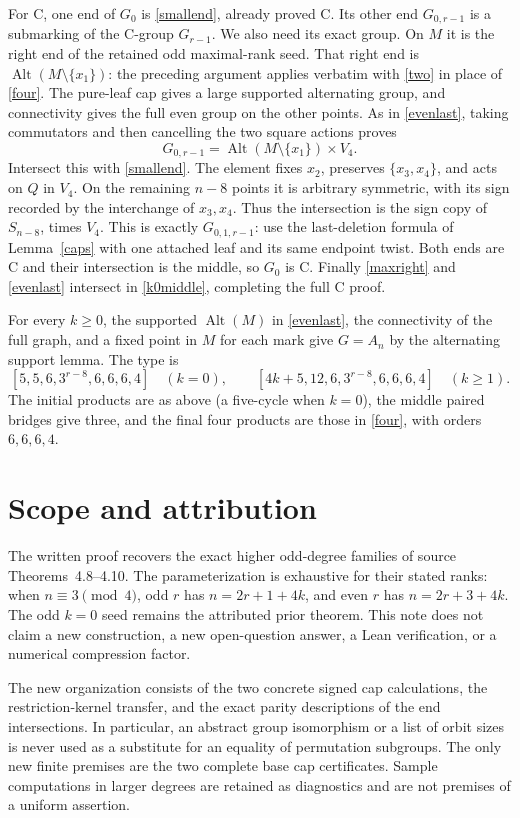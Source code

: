 \documentclass[11pt]{article}
\newcommand{\Alt}{\operatorname{Alt}}
\begin{document}
For C, one end of $G_0$ is \eqref{smallend}, already proved C.
Its other end $G_{0,r-1}$ is a submarking of the C-group
$G_{r-1}$. We also need its exact group. On $M$ it is the
right end of the retained odd maximal-rank seed. That right
end is $\Alt(M\setminus\{x_1\})$: the preceding argument
applies verbatim with \eqref{two} in place of \eqref{four}.
The pure-leaf cap gives a large supported alternating group,
and connectivity gives the full even group on the other points.
As in \eqref{evenlast}, taking commutators and then cancelling
the two square actions proves
\begin{equation}\label{k0middle}
 G_{0,r-1}=\Alt(M\setminus\{x_1\})\times V_4.
\end{equation}
Intersect this with \eqref{smallend}. The element fixes $x_2$,
preserves $\{x_3,x_4\}$, and acts on $Q$ in $V_4$. On the
remaining $n-8$ points it is arbitrary symmetric, with its sign
recorded by the interchange of $x_3,x_4$. Thus the intersection
is the sign copy of $S_{n-8}$, times $V_4$. This is exactly
$G_{0,1,r-1}$: use the last-deletion formula of
Lemma~\ref{caps} with one attached leaf and its same endpoint
twist. Both ends are C and their intersection is the middle,
so $G_0$ is C. Finally \eqref{maxright} and \eqref{evenlast}
intersect in \eqref{k0middle}, completing the full C proof.

For every $k\ge0$, the supported $\Alt(M)$ in
\eqref{evenlast}, the connectivity of the full graph, and a
fixed point in $M$ for each mark give $G=A_n$ by the alternating
support lemma. The type is
\[
 [5,5,6,3^{r-8},6,6,6,4]\quad(k=0),\qquad
 [4k+5,12,6,3^{r-8},6,6,6,4]\quad(k\ge1).
\]
The initial products are as above (a five-cycle when $k=0$),
the middle paired bridges give three, and the final four
products are those in \eqref{four}, with orders $6,6,6,4$.

\section{Scope and attribution}
The written proof recovers the exact higher odd-degree families
of source Theorems~4.8--4.10. The parameterization is exhaustive
for their stated ranks: when $n\equiv3\pmod4$, odd $r$ has
$n=2r+1+4k$, and even $r$ has $n=2r+3+4k$. The odd $k=0$
seed remains the attributed prior theorem. This note does not
claim a new construction, a new open-question answer, a Lean
verification, or a numerical compression factor.

The new organization consists of the two concrete signed cap
calculations, the restriction-kernel transfer, and the exact
parity descriptions of the end intersections. In particular,
an abstract group isomorphism or a list of orbit sizes is never
used as a substitute for an equality of permutation subgroups.
The only new finite premises are the two complete base cap
certificates. Sample computations in larger degrees are retained
as diagnostics and are not premises of a uniform assertion.
\end{document}
